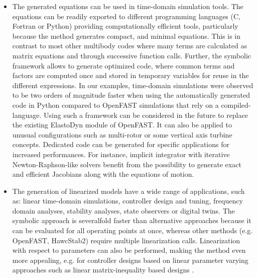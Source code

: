 \documentclass[wes, manuscript]{copernicus}
\begin{document}
\begin{itemize}
\item The generated equations can be used in time-domain simulation tools. The equations can be readily 
exported to different programming languages (C, Fortran or Python)  providing computationally efficient tools, particularly because the method generates compact, and minimal equations. This is in contrast to most other multibody codes where many terms are calculated as matrix equations and through successive function calls. Further, the symbolic framework allows to generate optimized code, where common terms and factors are computed once and stored in temporary variables for reuse in the different expressions.
%
In our examples, time-domain simulations were observed to be two orders of magnitude faster when using the automatically generated code in Python compared to OpenFAST simulations that rely on a compiled-language. 
%
Using such a framework can be considered in the future to replace the existing ElastoDyn module of OpenFAST. It can also be applied to unusual configurations such as multi-rotor or some vertical axis turbine concepts. 
%
Dedicated code can be generated for specific applications for increased performances. For instance, implicit integrator with iterative Newton-Raphson-like solvers benefit from the possibility to generate exact and efficient Jacobians along with the equations of motion.





\item The generation of linearized models have a wide range of applications, such as: linear time-domain simulations, controller design and tuning, frequency domain analyses, stability analyses, state observers or digital twins.
The symbolic approach is severalfold faster than alternative approaches because it can be evaluated for all operating points at once, whereas other methods (e.g. OpenFAST, HawcStab2) require multiple linearization calls. Linearization with respect to parameters can also be performed, making the method even more appealing, e.g. for controller designs based on linear parameter varying approaches such as linear matrix-inequality based designs \citep{Poschke:2020}.



\end{itemize}
\end{document}
